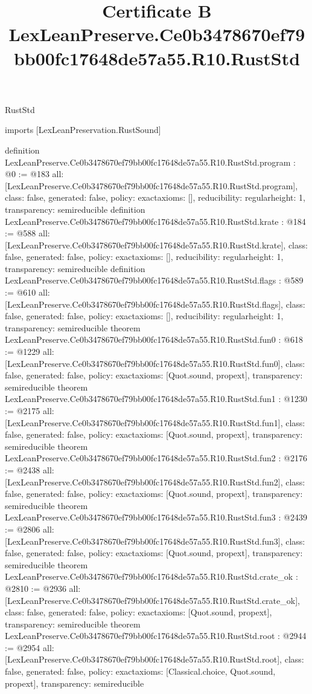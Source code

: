 \begin{lexlean}{RustStd}
\title{Certificate B LexLeanPreserve.Ce0b3478670ef79bb00fc17648de57a55.R10.RustStd}
\begin{coremodule}
imports [LexLeanPreservation.RustSound]

definition LexLeanPreserve.Ce0b3478670ef79bb00fc17648de57a55.R10.RustStd.program : @0 := @183 {
  all: [LexLeanPreserve.Ce0b3478670ef79bb00fc17648de57a55.R10.RustStd.program],
  class: false,
  generated: false,
  policy: exact{axioms: []},
  reducibility: regular{height: 1},
  transparency: semireducible
}
definition LexLeanPreserve.Ce0b3478670ef79bb00fc17648de57a55.R10.RustStd.krate : @184 := @588 {
  all: [LexLeanPreserve.Ce0b3478670ef79bb00fc17648de57a55.R10.RustStd.krate],
  class: false,
  generated: false,
  policy: exact{axioms: []},
  reducibility: regular{height: 1},
  transparency: semireducible
}
definition LexLeanPreserve.Ce0b3478670ef79bb00fc17648de57a55.R10.RustStd.flags : @589 := @610 {
  all: [LexLeanPreserve.Ce0b3478670ef79bb00fc17648de57a55.R10.RustStd.flags],
  class: false,
  generated: false,
  policy: exact{axioms: []},
  reducibility: regular{height: 1},
  transparency: semireducible
}
theorem LexLeanPreserve.Ce0b3478670ef79bb00fc17648de57a55.R10.RustStd.fun0 : @618 := @1229 {
  all: [LexLeanPreserve.Ce0b3478670ef79bb00fc17648de57a55.R10.RustStd.fun0],
  class: false,
  generated: false,
  policy: exact{axioms: [Quot.sound, propext]},
  transparency: semireducible
}
theorem LexLeanPreserve.Ce0b3478670ef79bb00fc17648de57a55.R10.RustStd.fun1 : @1230 := @2175 {
  all: [LexLeanPreserve.Ce0b3478670ef79bb00fc17648de57a55.R10.RustStd.fun1],
  class: false,
  generated: false,
  policy: exact{axioms: [Quot.sound, propext]},
  transparency: semireducible
}
theorem LexLeanPreserve.Ce0b3478670ef79bb00fc17648de57a55.R10.RustStd.fun2 : @2176 := @2438 {
  all: [LexLeanPreserve.Ce0b3478670ef79bb00fc17648de57a55.R10.RustStd.fun2],
  class: false,
  generated: false,
  policy: exact{axioms: [Quot.sound, propext]},
  transparency: semireducible
}
theorem LexLeanPreserve.Ce0b3478670ef79bb00fc17648de57a55.R10.RustStd.fun3 : @2439 := @2806 {
  all: [LexLeanPreserve.Ce0b3478670ef79bb00fc17648de57a55.R10.RustStd.fun3],
  class: false,
  generated: false,
  policy: exact{axioms: [Quot.sound, propext]},
  transparency: semireducible
}
theorem LexLeanPreserve.Ce0b3478670ef79bb00fc17648de57a55.R10.RustStd.crate_ok : @2810 := @2936 {
  all: [LexLeanPreserve.Ce0b3478670ef79bb00fc17648de57a55.R10.RustStd.crate_ok],
  class: false,
  generated: false,
  policy: exact{axioms: [Quot.sound, propext]},
  transparency: semireducible
}
theorem LexLeanPreserve.Ce0b3478670ef79bb00fc17648de57a55.R10.RustStd.root : @2944 := @2954 {
  all: [LexLeanPreserve.Ce0b3478670ef79bb00fc17648de57a55.R10.RustStd.root],
  class: false,
  generated: false,
  policy: exact{axioms: [Classical.choice, Quot.sound, propext]},
  transparency: semireducible
}


\end{coremodule}
\end{lexlean}
